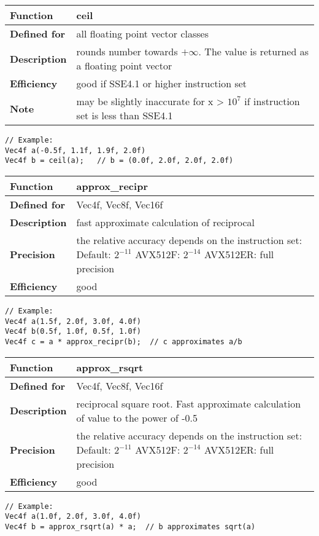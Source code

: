\documentclass[vcl_manual.tex]{subfiles}
\begin{document}
\begin{tabular}{|p{25mm}|p{100mm}|}
\hline
\bfseries Function & ceil \\ \hline
\bfseries Defined for & all floating point vector classes \\ \hline
\bfseries Description & rounds number towards $+\infty$. The value is returned as a floating point vector \\ \hline
\bfseries Efficiency & good if SSE4.1 or higher instruction set \\ \hline
\bfseries Note & may be slightly inaccurate for x \textgreater{} $10^7$ if instruction set is less than SSE4.1 \\ \hline
\end{tabular}
\begin{lstlisting}[frame=none]
// Example:
Vec4f a(-0.5f, 1.1f, 1.9f, 2.0f)
Vec4f b = ceil(a);   // b = (0.0f, 2.0f, 2.0f, 2.0f)
\end{lstlisting}


\begin{tabular}{|p{25mm}|p{100mm}|}
\hline
\bfseries Function & approx\_recipr \\ \hline
\bfseries Defined for & Vec4f, Vec8f, Vec16f \\ \hline
\bfseries Description & fast approximate calculation of reciprocal  \\ \hline
\bfseries Precision & the relative accuracy depends on the instruction set:\newline
Default: $2^{-11}$\newline
AVX512F: $2^{-14}$\newline
AVX512ER: full precision \\ \hline
\bfseries Efficiency & good \\ \hline
\end{tabular}
\begin{lstlisting}[frame=none]
// Example:
Vec4f a(1.5f, 2.0f, 3.0f, 4.0f)
Vec4f b(0.5f, 1.0f, 0.5f, 1.0f)
Vec4f c = a * approx_recipr(b);  // c approximates a/b
\end{lstlisting}


\begin{tabular}{|p{25mm}|p{100mm}|}
\hline
\bfseries Function & approx\_rsqrt \\ \hline
\bfseries Defined for & Vec4f, Vec8f, Vec16f \\ \hline
\bfseries Description & reciprocal square root. Fast approximate calculation of value to the power of -0.5 \\ \hline
\bfseries Precision & the relative accuracy depends on the instruction set:\newline
Default: $2^{-11}$\newline
AVX512F: $2^{-14}$\newline
AVX512ER: full precision \\ \hline
\bfseries Efficiency & good \\ \hline
\end{tabular}
\begin{lstlisting}[frame=none]
// Example:
Vec4f a(1.0f, 2.0f, 3.0f, 4.0f)
Vec4f b = approx_rsqrt(a) * a;  // b approximates sqrt(a)
\end{lstlisting}
\end{document}
